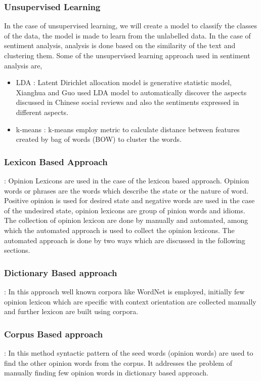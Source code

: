\documentclass[sigconf]{acmart}
\begin{document}
\subsubsection*{Unsupervised Learning}
In the case of unsupervised learning, we will create a model to classify the classes of the data, the model is made to learn from the unlabelled data. In the case of sentiment analysis, analysis is done based on the similarity of the text and clustering them. Some of the unsupervised learning approach used in sentiment analysis are, 
\begin{itemize}
    \item LDA :  Latent Dirichlet allocation model is generative statistic model, Xianghua and Guo \cite{XIANGHUA2013186} used LDA model to automatically discover the aspects discussed in Chinese social reviews and also the sentiments expressed in different aspects.
    \item k-means : k-means employ metric to calculate distance between features created by bag of words (BOW) to cluster the words. 
\end{itemize}

\subsubsection{Lexicon Based Approach}: Opinion Lexicons are used in the case of the lexicon based approach. Opinion words or phrases are the words which describe the state or the nature of word. Positive opinion is used for desired state and negative words are used in the case of the undesired state, opinion lexicons are group of pinion words and idioms. The collection of opinion lexicon are done by manually and automated, among which the automated approach is used to collect the opinion lexicons. The automated approach is done by two ways which are discussed in the following sections.

\subsubsection*{Dictionary Based approach} : In this approach well known corpora like WordNet \cite{MEDHAT20141093} is employed, initially few opinion lexicon which are specific with context orientation are collected manually and further lexicon are built using corpora.

\subsubsection*{Corpus Based approach} : In this method syntactic pattern of the seed words (opinion words) are used to find the other opinion words from the corpus. It addresses the problem of manually finding few opinion words in dictionary based approach.
\end{document}
